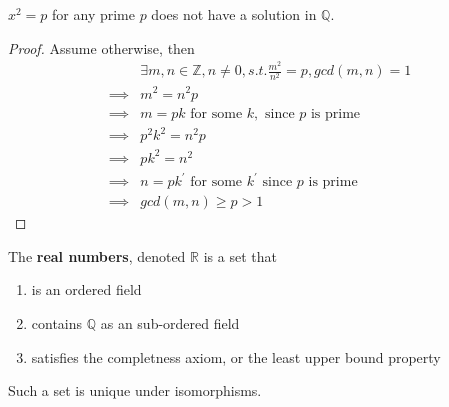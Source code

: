 \begin{remark} $x^2 = p$ for any prime $p$ does not have a solution in $\mathbb{Q}$.
\end{remark}
\begin{proof}
  Assume otherwise, then
  \begin{align*}
    & \exists m, n \in \mathbb{Z}, n \neq 0, s.t. \frac{m^2}{n^2} = p, gcd(m, n) = 1\\
    \implies & m^2 = n^2 p \\
    \implies & m = pk \text{ for some } k, \text{ since $p$ is prime}\\
    \implies & p^2 k^2 = n^2 p \\
    \implies & p k^2 = n^2 \\
    \implies & n = pk^{\prime} \text{ for some } k^{\prime} \text{ since $p$ is prime}\\
    \implies & gcd(m, n) \geq p > 1
  \end{align*}
\end{proof}

\begin{definition} The \textbf{real numbers}, denoted $\mathbb{R}$ is a set that 
  \begin{enumerate}[label=(\roman*)]
    \item is an ordered field
    \item contains $\mathbb{Q}$ as an sub-ordered field
    \item satisfies the completness axiom, or the least upper bound property
  \end{enumerate}
\end{definition}

\begin{remark}
  Such a set is unique under isomorphisms.
\end{remark}

